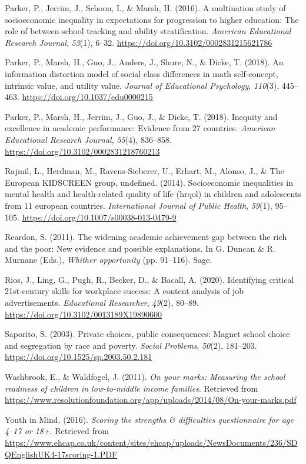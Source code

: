 \documentclass[
  english,
  man]{apa6}
\newlength{\cslhangindent}
\newenvironment{cslreferences}%
  {\setlength{\parindent}{0pt}%
  \everypar{\setlength{\hangindent}{\cslhangindent}}\ignorespaces}%
  {\par}
\begin{document}
\begin{cslreferences}
\leavevmode\hypertarget{ref-parker2016}{}%
Parker, P., Jerrim, J., Schoon, I., \& Marsh, H. (2016). A multination study of socioeconomic inequality in expectations for progression to higher education: The role of between-school tracking and ability stratification. \emph{American Educational Research Journal}, \emph{53}(1), 6--32. \url{https://doi.org/10.3102/0002831215621786}

\leavevmode\hypertarget{ref-parker_information_2018}{}%
Parker, P., Marsh, H., Guo, J., Anders, J., Shure, N., \& Dicke, T. (2018). An information distortion model of social class differences in math self-concept, intrinsic value, and utility value. \emph{Journal of Educational Psychology}, \emph{110}(3), 445--463. \url{https://doi.org/10.1037/edu0000215}

\leavevmode\hypertarget{ref-parker2018}{}%
Parker, P., Marsh, H., Jerrim, J., Guo, J., \& Dicke, T. (2018). Inequity and excellence in academic performance: Evidence from 27 countries. \emph{American Educational Research Journal}, \emph{55}(4), 836--858. \url{https://doi.org/10.3102/0002831218760213}

\leavevmode\hypertarget{ref-rajmil2014}{}%
Rajmil, L., Herdman, M., Ravens-Sieberer, U., Erhart, M., Alonso, J., \& The European KIDSCREEN group, undefined. (2014). Socioeconomic inequalities in mental health and health-related quality of life (hrqol) in children and adolescents from 11 european countries. \emph{International Journal of Public Health}, \emph{59}(1), 95--105. \url{https://doi.org/10.1007/s00038-013-0479-9}

\leavevmode\hypertarget{ref-reardon2011}{}%
Reardon, S. (2011). The widening academic achievement gap between the rich and the poor: New evidence and possible explanations. In G. Duncan \& R. Murnane (Eds.), \emph{Whither opportunity} (pp. 91--116). Sage.

\leavevmode\hypertarget{ref-rios2020}{}%
Rios, J., Ling, G., Pugh, R., Becker, D., \& Bacall, A. (2020). Identifying critical 21st-century skills for workplace success: A content analysis of job advertisements. \emph{Educational Researcher}, \emph{49}(2), 80--89. \url{https://doi.org/10.3102/0013189X19890600}

\leavevmode\hypertarget{ref-saporito2003}{}%
Saporito, S. (2003). Private choices, public consequences: Magnet school choice and segregation by race and poverty. \emph{Social Problems}, \emph{50}(2), 181--203. \url{https://doi.org/10.1525/sp.2003.50.2.181}

\leavevmode\hypertarget{ref-washbrook2011}{}%
Washbrook, E., \& Waldfogel, J. (2011). \emph{On your marks: Measuring the school readiness of children in low-to-middle income families}. Retrieved from \url{https://www.resolutionfoundation.org/app/uploads/2014/08/On-your-marks.pdf}

\leavevmode\hypertarget{ref-youth2016scoring}{}%
Youth in Mind. (2016). \emph{Scoring the strengths \& difficulties questionnaire for age 4--17 or 18+}. Retrieved from \url{https://www.ehcap.co.uk/content/sites/ehcap/uploads/NewsDocuments/236/SDQEnglishUK4-17scoring-1.PDF}
\end{cslreferences}

\endgroup
\end{document}
